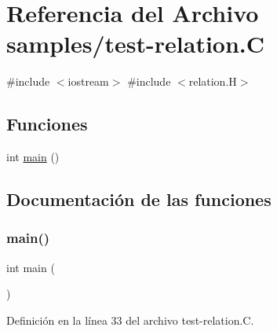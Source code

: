 \hypertarget{test-relation_8_c}{}\section{Referencia del Archivo samples/test-\/relation.C}
\label{test-relation_8_c}
{\ttfamily \#include $<$iostream$>$}\newline
{\ttfamily \#include $<$relation.\+H$>$}\newline
\subsection*{Funciones}
\begin{DoxyCompactItemize}
\item 
int \hyperlink{test-relation_8_c_ae66f6b31b5ad750f1fe042a706a4e3d4}{main} ()
\end{DoxyCompactItemize}


\subsection{Documentación de las funciones}
\mbox{\label{test-relation_8_c_ae66f6b31b5ad750f1fe042a706a4e3d4}} 
\subsubsection{\texorpdfstring{main()}{main()}}
{\footnotesize\ttfamily int main (\begin{DoxyParamCaption}{ }\end{DoxyParamCaption})}



Definición en la línea 33 del archivo test-\/relation.\+C.

